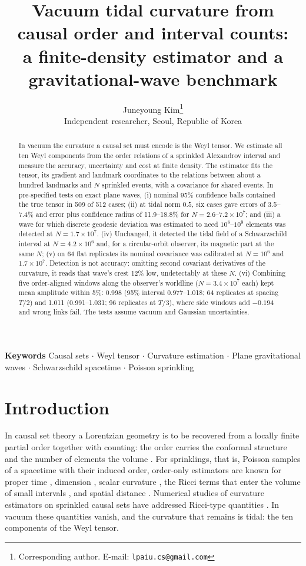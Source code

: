 \documentclass[11pt,a4paper]{article}
\title{Vacuum tidal curvature from causal order and interval counts:\\
a finite-density estimator and a gravitational-wave benchmark}
\author{Juneyoung Kim\thanks{Corresponding author. E-mail: \texttt{lpaiu.cs@gmail.com}}\\
\small Independent researcher, Seoul, Republic of Korea}
\date{}
\begin{document}
\maketitle
\begin{abstract}
In vacuum the curvature a causal set must encode is the Weyl tensor. We
estimate all ten Weyl components from the order relations of a sprinkled
Alexandrov interval and measure the accuracy, uncertainty and cost at finite
density. The estimator fits the tensor, its gradient and landmark
coordinates to the relations between about a hundred landmarks and $N$
sprinkled events, with a covariance for shared events. In pre-specified
tests on exact plane waves, (i) nominal
95\% confidence balls contained the true tensor in 509 of 512 cases; (ii)
at tidal norm $0.5$, six cases gave errors of 3.5--7.4\% and error plus
confidence radius of 11.9--18.8\% for $N=2.6$--$7.2\times10^7$; and (iii) a
wave for which discrete geodesic deviation was estimated to need
$10^8$--$10^9$ elements was detected at $N=1.7\times10^7$. (iv) Unchanged,
it detected the tidal field of a Schwarzschild interval at
$N=4.2\times10^6$ and, for a circular-orbit observer, its magnetic part at
the same $N$; (v) on 64 flat replicates its nominal covariance was
calibrated at $N=10^6$ and $1.7\times10^7$. Detection is not accuracy:
omitting second covariant derivatives of the curvature, it reads that wave's
crest 12\% low, undetectably at these $N$. (vi) Combining five order-aligned windows along the observer's worldline
($N=3.4\times10^7$ each) kept mean amplitude within 5\%: 0.998 (95\%
interval 0.977--1.018; 64 replicates at spacing $T/2$) and 1.011
(0.991--1.031; 96 replicates at $T/3$), where side windows add $-0.194$ and
wrong links fail. The tests assume vacuum and Gaussian uncertainties.
\end{abstract}

\noindent\textbf{Keywords} Causal sets $\cdot$ Weyl tensor $\cdot$ Curvature
estimation $\cdot$ Plane gravitational waves $\cdot$ Schwarzschild spacetime
$\cdot$ Poisson sprinkling

\section{Introduction}
In causal set theory a Lorentzian geometry is to be recovered from a locally
finite partial order together with counting: the order carries the conformal
structure \cite{zeeman,hkm,malament} and the number of elements the volume
\cite{blms,surya,braun}. For sprinklings, that is, Poisson samples of a
spacetime with their induced order, order-only estimators are known for
proper time \cite{myrheim,brightwell}, dimension \cite{myrheim,meyer},
scalar curvature \cite{benincasa}, the Ricci terms that enter the volume of
small intervals \cite{gibbons,roy}, and spatial distance
\cite{rideout,eichhorn,boguna}. Numerical studies of curvature estimators on
sprinkled causal sets have addressed Ricci-type quantities
\cite{kambor,barton}. In vacuum these quantities vanish, and the curvature
that remains is tidal: the ten components of the Weyl tensor.
\end{document}
